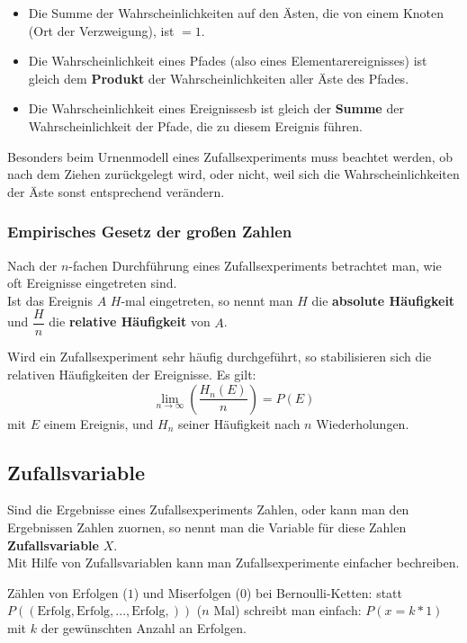 \documentclass[../MAIN/main.tex]{subfiles}
\begin{document}
\begin{Definition}[- Pfadregeln]
  \begin{itemize}
    \item Die Summe der Wahrscheinlichkeiten auf den Ästen, die von einem Knoten (Ort der Verzweigung), ist $=1$.
    \item Die Wahrscheinlichkeit eines Pfades (also eines Elementarereignisses) ist gleich dem \textbf{Produkt} der Wahrscheinlichkeiten aller Äste des Pfades.
    \item Die Wahrscheinlichkeit eines Ereignissesb ist gleich der \textbf{Summe} der Wahrscheinlichkeit der Pfade, die zu diesem Ereignis führen.
  \end{itemize}
\end{Definition}
\begin{Bemerkung}
  Besonders beim Urnenmodell eines Zufallsexperiments muss beachtet werden, ob nach dem Ziehen zurückgelegt wird, oder nicht, weil sich die Wahrscheinlichkeiten der Äste sonst entsprechend verändern.
\end{Bemerkung}

\subsubsection{Empirisches Gesetz der großen Zahlen}
\begin{Definition}[- Häufigkeiten]
  Nach der $n$-fachen Durchführung eines Zufallsexperiments betrachtet man, wie oft Ereignisse eingetreten sind.\\
  Ist das Ereignis $A$ $H$-mal eingetreten, so nennt man $H$ die \textbf{absolute Häufigkeit} und $\dfrac{H}{n}$ die \textbf{relative Häufigkeit} von $A$.
\end{Definition}
\begin{Theorem}
  Wird ein Zufallsexperiment sehr häufig durchgeführt, so stabilisieren sich die relativen Häufigkeiten der Ereignisse. Es gilt:
  $$\lim_{n\to \infty} \left(\dfrac{H_n(E)}{n}\right) = P(E)$$mit $E$ einem Ereignis, und $H_n$ seiner Häufigkeit nach $n$ Wiederholungen.
\end{Theorem}



\subsection{Zufallsvariable}
\begin{Definition}
  Sind die Ergebnisse eines Zufallsexperiments Zahlen, oder kann man den Ergebnissen Zahlen zuornen, so nennt man die Variable für diese Zahlen \textbf{Zufallsvariable} $X$.\\
  Mit Hilfe von Zufallsvariablen kann man Zufallsexperimente einfacher bechreiben.
\end{Definition}
\begin{Beispiel}
  Zählen von Erfolgen ($1$) und Miserfolgen ($0$) bei Bernoulli-Ketten: statt $P((\text{Erfolg},\text{Erfolg},...,\text{Erfolg},))$ ($n$ Mal) schreibt man einfach: $P(x=k*1)$ mit $k$ der gewünschten Anzahl an Erfolgen.
\end{Beispiel}
\end{document}
